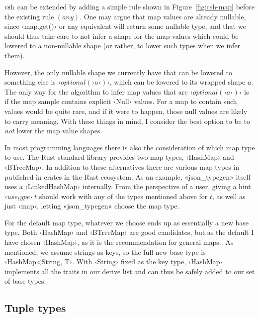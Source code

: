 $\operatorname{csh}$ can be extended by adding a simple rule shown in Figure~\ref{fig:csh-map} before the existing rule $(any)$. One may argue that map values are already nullable, since ‹map.get()› or any equivalent will return some nullable type, and that we should thus take care to not infer a shape for the map values which could be lowered to a non-nullable shape (or rather, to lower such types when we infer them).

However, the only nullable shape we currently have that can be lowered to something else is $‹optional(›a‹)›$, which can be lowered to its wrapped shape $a$. The only way for the algorithm to infer map values that are $‹optional(›a‹)›$ is if the map sample contains explicit ‹Null› values. For a map to contain such values would be quite rare, and if it were to happen, those null values are likely to carry meaning. With these things in mind, I consider the best option to be to \emph{not} lower the map value shapes.

In most programming languages there is also the consideration of which map type to use. The Rust standard library provides two map types, ‹HashMap› and ‹BTreeMap›. In addition to these alternatives there are various map types in published in crates in the Rust ecosystem. As an example, «json_typegen» itself uses a ‹LinkedHashMap› internally. From the perspective of a user, giving a hint $‹use_type›\ t$ should work with any of the types mentioned above for $t$, as well as just ‹map›, letting «json_typegen» choose the map type.

For the default map type, whatever we choose ends up as essentially a new base type. Both ‹HashMap› and ‹BTreeMap› are good candidates, but as the default I have chosen ‹HashMap›, as it is the recommendation for general maps.\cite[std::collections]{rust-std-docs}. As mentioned, we assume strings as keys, so the full new base type is ‹HashMap<String, T›. With ‹String› fixed as the key type, ‹HashMap› implements all the traits in our derive list and can thus be safely added to our set of base types.



\subsection{Tuple types}
\label{sec:ext-tuples}

